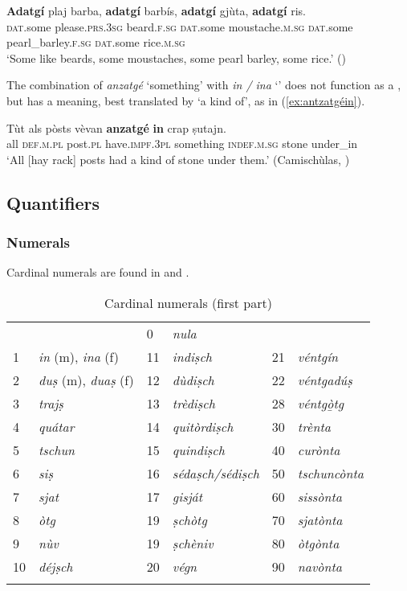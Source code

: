 \ea\label{ex:adatgi1}
\gll  \textbf{Adatgí} plaj barba, \textbf{adatgí} barbís, \textbf{adatgí} gjùta, \textbf{adatgí} ris. \\
\textsc{dat}.some please.\textsc{prs.3sg} beard.\textsc{f.sg}  \textsc{dat}.some moustache.\textsc{m.sg} \textsc{dat}.some pearl\_barley.\textsc{f.sg} \textsc{dat}.some rice.\textsc{m.sg} \\
\glt `Some like beards, some moustaches, some pearl barley, some rice.' ()
\z

The combination of \textit{anzatgé} `something' with \textit{in / ina} `' does not function as a , but has a  meaning, best translated by `a kind of', as in (\ref{ex:antzatgéin}).

\ea\label{ex:antzatgéin}
\gll   Tùt als pòsts vèvan \textbf{anzatgé} \textbf{in} crap ṣutajn.\\
all \textsc{def.m.pl} post.\textsc{pl} have.\textsc{impf.3pl} something \textsc{indef.m.sg} stone under\_in\\
\glt `All [hay rack] posts had a kind of stone under them.' (Camischùlas, )
\z

\subsection{Quantifiers}\label{sec:3.2.5}

\subsubsection{Numerals}\label{sec:3.2.5.1}
Cardinal numerals are found in  and .


\begin{table}
\caption{Cardinal numerals (first part)} 
\label{tab:cardnum1}
 \begin{tabular}{llllll}
  \lsptoprule
 &&0&\textit{nula}\\
1&\textit{in} (m), \textit{ina} (f)&11&\textit{indiṣch}&21&\textit{véntgín}\\
2&\textit{duṣ} (m), \textit{duaṣ} (f) &12&\textit{dùdiṣch}&22&\textit{véntgadúṣ}\\
3&\textit{trajṣ}&13&\textit{trèdiṣch}&28&\textit{véntg{\`o̱}tg}\\
4&\textit{quátar}&14&\textit{quitòrdiṣch}&30 & \textit{trènta}\\
5&\textit{tschun}&15&\textit{quindiṣch} & 40 & \textit{curònta}\\
6&\textit{siṣ}&16&\textit{sédaṣch/sédiṣch}& 50 & \textit{tschuncònta}\\
7&\textit{sjat}&17&\textit{gisját} & 60 & \textit{sissònta}\\
8&\textit{òtg}&19& \textit{ṣchòtg} & 70 & \textit{sjatònta}\\
9&\textit{nùv}&19& \textit{ṣchèniv} & 80 & \textit{òtgònta}\\
10&\textit{déjṣch}&20&\textit{végn} & 90 & \textit{navònta}\\
  \lspbottomrule
 \end{tabular}
\end{table}

